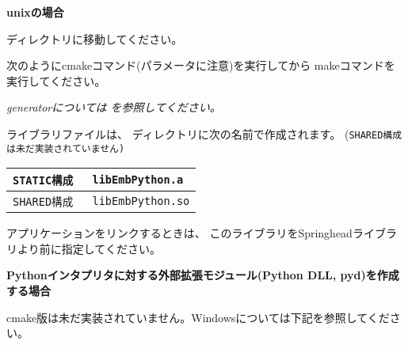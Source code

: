 \medskip
\bf{unixの場合}
\begin{narrow}
	ディレクトリに移動してください。

	次のようにcmakeコマンド(パラメータに注意)を実行してから
	makeコマンドを実行してください。


	\begin{narrow}[s]
		\it{generator}については
		 を参照してください。
	\end{narrow}

	\medskip
	ライブラリファイルは、
	ディレクトリに次の名前で作成されます。
	(\tt{SHARED}構成は未だ実装されていません)

	\medskip
	\begin{center}
	\begin{tabular}{l@{\ \ ---\ \ }l}\hline
		\tt{STATIC}構成 & \tt{libEmbPython.a}\\\hline
		\tt{SHARED}構成 & \tt{libEmbPython.so}\\\hline
	\end{tabular}
	\end{center}

	\bigskip
	アプリケーションをリンクするときは、
	このライブラリをSpringheadライブラリより前に指定してください。
\end{narrow}

\bigskip
\thinrule{\linewidth}

\noindent
\bf{Pythonインタプリタに対する外部拡張モジュール(Python DLL, pyd)を作成する場合}

\bigskip
cmake版は未だ実装されていません。Windowsについては下記を参照してください。

\medskip
{}
\bigskip

